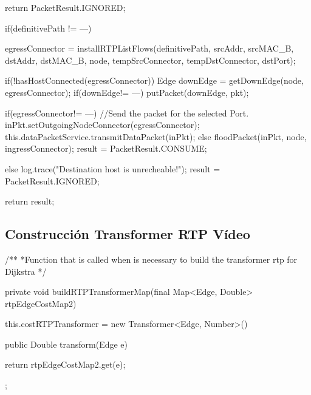 \documentclass[a4paper,11pt]{book}
\begin{document}
\begin{java}
{{{          return PacketResult.IGNORED;
        }

        if(definitivePath != ---){

          egressConnector = installRTPListFlows(definitivePath, srcAddr, srcMAC_B, dstAddr, dstMAC_B, node,
          tempSrcConnector, tempDstConnector, dstPort);


          if(!hasHostConnected(egressConnector)){
            Edge downEdge = getDownEdge(node, egressConnector);
            if(downEdge!= ---){
              putPacket(downEdge, pkt);
            }
          }

          if(egressConnector!= ---){
          //Send the packet for the selected Port.
            inPkt.setOutgoingNodeConnector(egressConnector);
            this.dataPacketService.transmitDataPacket(inPkt);
          }else{
            floodPacket(inPkt, node, ingressConnector);
          }
          result = PacketResult.CONSUME;

        }else{
          log.trace("Destination host is unrecheable!");
          result = PacketResult.IGNORED;
        }
      }

      return result;
    }
\end{java}

\newpage
\subsection{Construcción Transformer \ac{RTP} Vídeo}\label{transformer}
\begin{java}
		/**
	  *Function that is called when is necessary to build the transformer rtp for Dijkstra
	  */

	  private void buildRTPTransformerMap(final Map<Edge, Double> rtpEdgeCostMap2){

	    this.costRTPTransformer = new Transformer<Edge, Number>(){
	      public Double transform(Edge e){

	        return rtpEdgeCostMap2.get(e);
	      }
	    };

	  }
\end{java}

\cleardoublepage
{}
{}



\end{document}
